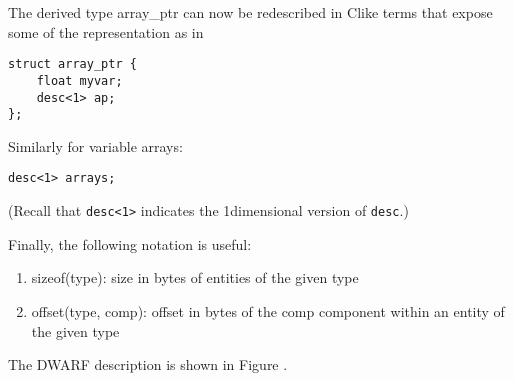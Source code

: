 The  derived type array\_ptr can now be redescribed
in C\dash like terms that expose some of the representation as in

\begin{lstlisting}[numbers=none]
struct array_ptr {
    float myvar;
    desc<1> ap;
};
\end{lstlisting}

Similarly for variable arrays:
\begin{lstlisting}[numbers=none]
desc<1> arrays;
\end{lstlisting}

(Recall that \texttt{desc\textless 1\textgreater} 
indicates the 1\dash dimensional version of \texttt{desc}.)

\newpage
Finally, the following notation is useful:
\begin{enumerate}[1. ]
\item  sizeof(type): size in bytes of entities of the given type
\item offset(type, comp): offset in bytes of the comp component
within an entity of the given type
\end{enumerate}

The DWARF description is shown 
in Figure .

